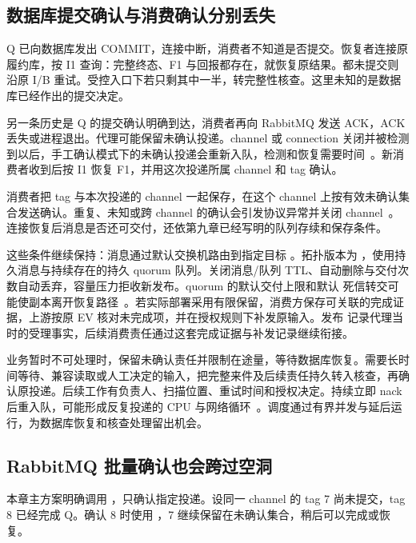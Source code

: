 \subsection*{数据库提交确认与消费确认分别丢失}

Q 已向数据库发出 COMMIT，连接中断，消费者不知道是否提交。恢复者连接原履约库，按 I1 查询：完整终态、F1 与回报都存在，就恢复原结果。都未提交则沿原 I/B 重试。受控入口下若只剩其中一半，转完整性核查。这里未知的是数据库已经作出的提交决定。

另一条历史是 Q 的提交确认明确到达，消费者再向 RabbitMQ 发送 ACK，ACK 丢失或进程退出。代理可能保留未确认投递。channel 或 connection 关闭并被检测到以后，手工确认模式下的未确认投递会重新入队，检测和恢复需要时间~\cite{rabbitmq-confirms}。新消费者收到后按 I1 恢复 F1，并用这次投递所属 channel 和 tag 确认。


消费者把 tag 与本次投递的 channel 一起保存，在这个 channel 上按有效未确认集合发送确认。重复、未知或跨 channel 的确认会引发协议异常并关闭 channel~\cite{rabbitmq-confirms}。连接恢复后消息是否还可交付，还依第九章已经写明的队列存续和保存条件。

这些条件继续保持：消息通过默认交换机路由到指定目标 。拓扑版本为 ，使用持久消息与持续存在的持久 quorum 队列。关闭消息/队列 TTL、自动删除与交付次数自动丢弃，容量压力拒收新发布。quorum 的默认交付上限和默认  死信转交可能使副本离开恢复路径~\cite{rabbitmq-quorum-queues}。若实际部署采用有限保留，消费方保存可关联的完成证据，上游按原 EV 核对未完成项，并在授权规则下补发原输入。发布  记录代理当时的受理事实，后续消费责任通过这套完成证据与补发记录继续衔接。

业务暂时不可处理时，保留未确认责任并限制在途量，等待数据库恢复。需要长时间等待、兼容读取或人工决定的输入，把完整来件及后续责任持久转入核查，再确认原投递。后续工作有负责人、扫描位置、重试时间和授权决定。持续立即 nack 后重入队，可能形成反复投递的 CPU 与网络循环~\cite{rabbitmq-confirms}。调度通过有界并发与延后运行，为数据库恢复和核查处理留出机会。

\subsection*{RabbitMQ 批量确认也会跨过空洞}

本章主方案明确调用 ，只确认指定投递。设同一 channel 的 tag 7 尚未提交，tag 8 已经完成 Q。确认 8 时使用 ，7 继续保留在未确认集合，稍后可以完成或恢复。

